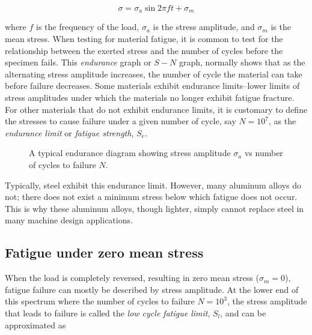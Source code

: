\documentclass[
fontsize=10pt,
a4paper,
twosides=false,
open=any,
svgnames,
]{kaobook} %
\begin{document}
\[\sigma  = \sigma _a\sin 2\pi ft + \sigma _m\]

where $f$ is the frequency of the load, $\sigma_a$ is the stress amplitude, and $\sigma_m$ is the mean stress.
When testing for material fatigue, it is common to test for the relationship between the exerted stress and the number of cycles before the specimen fails. This \emph{endurance} graph or $S-N$ graph, normally shows that as the alternating stress amplitude increases, the number of cycle the material can take before failure decreases. Some materials exhibit endurance limits--lower limits of stress amplitudes under which the materials no longer exhibit fatigue fracture. For other materials that do not exhibit endurance limits, it is customary to define the stresses to cause failure under a given number of cycle, say $N = 10^7$, as the \emph{endurance limit} or \emph{fatigue strength}, $S_e$.

\begin{figure}[h]
  \centering
  \caption{A typical endurance diagram showing stress amplitude $\sigma_a$ vs number of cycles to failure $N$.}
  \label{fig: S-N diagram}
\end{figure}

Typically, steel exhibit this endurance limit. However, many aluminum alloys do not; there does not exist a minimum stress below which fatigue does not occur. This is why these aluminum alloys, though lighter, simply cannot replace steel in many machine design applications.

\subsection{Fatigue under zero mean stress}

When the load is completely reversed, resulting in zero mean stress ($\sigma_m = 0$), fatigue failure can mostly be described by stress amplitude. At the lower end of this spectrum where the number of cycles to failure $N = 10^3$, the stress amplitude that leads to failure is called the \emph{low cycle fatigue limit}, $S_l$, and can be approximated as
\end{document}
